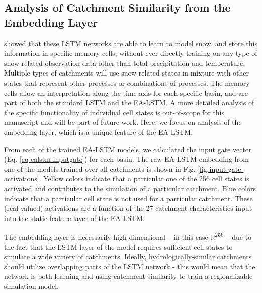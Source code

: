 \subsection{Analysis of Catchment Similarity from the Embedding Layer}\label{sec-embedding}

\citet{kratzert2018internals,kratzert2019neuralhydrology} showed that these \gls{LSTM} networks are able to learn to model snow, and store this information in specific memory cells, without ever directly training on any type of snow-related observation data other than total precipitation and temperature. Multiple types of catchments will use snow-related states in mixture with other states that represent other processes or combinations of processes. The memory cells allow an interpretation along the time axis for each specific basin, and are part of both the standard \gls{LSTM} and the \gls{EA-LSTM}. 
A more detailed analysis of the specific functionality of individual cell states is out-of-scope for this manuscript and will be part of future work. Here, we focus on analysis of the embedding layer, which is a unique feature of the \gls{EA-LSTM}.

From each of the trained \gls{EA-LSTM} models, we calculated the input gate vector (Eq. \ref{eq-ealstm-inputgate}) for each basin. The raw \gls{EA-LSTM} embedding from one of the models trained over all catchments is shown in Fig. \ref{fig-input-gate-activations}. 
Yellow colors indicate that a particular one of the 256 cell states is activated and contributes to the simulation of a particular catchment. Blue colors indicate that a particular cell state is not used for a particular catchment. These (real-valued) activations are a function of the 27 catchment characteristics input into the static feature layer of the \gls{EA-LSTM}. 

The embedding layer is necessarily high-dimensional -- in this case $\mathbb{R}$\textsuperscript{256} -- due to the fact that the \gls{LSTM} layer of the model requires sufficient cell states to simulate a wide variety of catchments. Ideally, hydrologically-similar catchments should utilize overlapping parts of the \gls{LSTM} network - this would mean that the network is both learning and using catchment similarity to train a regionalizable simulation model. 

